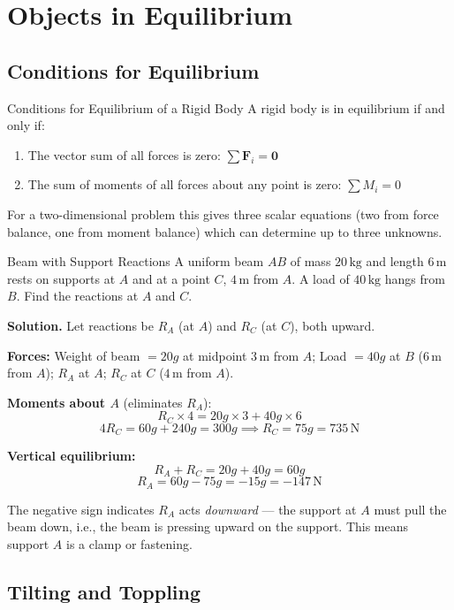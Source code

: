 \documentclass[12pt, a4paper]{book}
\newcommand{\Fvec}{\mathbf{F}}
\newcommand{\kg}{\,\mathrm{kg}}
\newcommand{\m}{\,\mathrm{m}}
\newcommand{\N}{\,\mathrm{N}}
\begin{document}
\section{Objects in Equilibrium}

\subsection{Conditions for Equilibrium}

\begin{thm}{Conditions for Equilibrium of a Rigid Body}{}
A rigid body is in equilibrium if and only if:
\begin{enumerate}[label=(\roman*)]
  \item The vector sum of all forces is zero: $\sum \Fvec_i = \mathbf{0}$
  \item The sum of moments of all forces about any point is zero: $\sum M_i = 0$
\end{enumerate}
\end{thm}

For a two-dimensional problem this gives three scalar equations (two from force balance, one from moment balance) which can determine up to three unknowns.

\begin{exmp}{Beam with Support Reactions}{}
A uniform beam $AB$ of mass $20\kg$ and length $6\m$ rests on supports at $A$ and at a point $C$, $4\m$ from $A$. A load of $40\kg$ hangs from $B$. Find the reactions at $A$ and $C$.

\medskip
\textbf{Solution.} Let reactions be $R_A$ (at $A$) and $R_C$ (at $C$), both upward.

\textbf{Forces:} Weight of beam $= 20g$ at midpoint $3\m$ from $A$; Load $= 40g$ at $B$ ($6\m$ from $A$); $R_A$ at $A$; $R_C$ at $C$ ($4\m$ from $A$).

\textbf{Moments about $A$} (eliminates $R_A$):
\[
  R_C \times 4 = 20g \times 3 + 40g \times 6
\]
\[
  4R_C = 60g + 240g = 300g \implies R_C = 75g = 735\N
\]

\textbf{Vertical equilibrium:}
\[
  R_A + R_C = 20g + 40g = 60g
\]
\[
  R_A = 60g - 75g = -15g = -147\N
\]

The negative sign indicates $R_A$ acts \emph{downward} --- the support at $A$ must pull the beam down, i.e., the beam is pressing upward on the support. This means support $A$ is a clamp or fastening.
\end{exmp}

\subsection{Tilting and Toppling}
\end{document}
